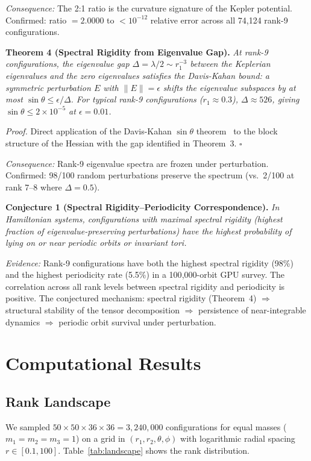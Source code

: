 \documentclass[aps,pre,twocolumn,superscriptaddress,floatfix]{revtex4-2}
\begin{document}
\emph{Consequence:} The 2:1 ratio is the curvature signature
of the Kepler potential. Confirmed: ratio $= 2.0000$ to
$< 10^{-12}$ relative error across all 74{,}124 rank-9 configurations.

\medskip
\noindent\textbf{Theorem 4 (Spectral Rigidity from Eigenvalue Gap).}
\emph{At rank-9 configurations, the eigenvalue gap
$\Delta = \lambda/2 \sim r_1^{-3}$ between the Keplerian eigenvalues
and the zero eigenvalues satisfies the Davis-Kahan bound: a symmetric
perturbation $E$ with $\|E\| = \epsilon$ shifts the eigenvalue
subspaces by at most $\sin\theta \leq \epsilon / \Delta$. For
typical rank-9 configurations ($r_1 \approx 0.3$), $\Delta \approx 526$,
giving $\sin\theta \leq 2 \times 10^{-5}$ at $\epsilon = 0.01$.}

\emph{Proof.} Direct application of the Davis-Kahan
$\sin\theta$ theorem~\cite{daviskahan1970} to the block structure
of the Hessian with the gap identified in Theorem~3. $\square$

\emph{Consequence:} Rank-9 eigenvalue spectra are frozen under
perturbation. Confirmed: 98/100 random perturbations preserve
the spectrum (vs.\ 2/100 at rank 7--8 where $\Delta = 0.5$).

\medskip
\noindent\textbf{Conjecture 1 (Spectral Rigidity--Periodicity Correspondence).}
\emph{In Hamiltonian systems, configurations with maximal spectral
rigidity (highest fraction of eigenvalue-preserving perturbations)
have the highest probability of lying on or near periodic orbits
or invariant tori.}

\emph{Evidence:} Rank-9 configurations have both the highest spectral
rigidity (98\%) and the highest periodicity rate (5.5\%) in a
100{,}000-orbit GPU survey. The correlation across all rank levels
between spectral rigidity and periodicity is positive. The conjectured
mechanism: spectral rigidity (Theorem~4) $\Rightarrow$ structural
stability of the tensor decomposition $\Rightarrow$ persistence of
near-integrable dynamics $\Rightarrow$ periodic orbit survival under
perturbation.

\section{Computational Results}

\subsection{Rank Landscape}

We sampled $50 \times 50 \times 36 \times 36 = 3{,}240{,}000$
configurations for equal masses ($m_1 = m_2 = m_3 = 1$) on a grid
in $(r_1, r_2, \theta, \phi)$ with logarithmic radial spacing
$r \in [0.1, 100]$. Table~\ref{tab:landscape} shows the rank distribution.
\end{document}
